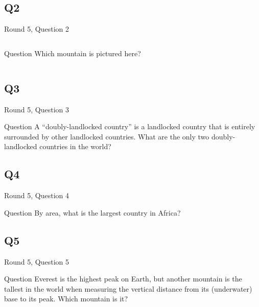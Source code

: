 \documentclass[11pt]{beamer}
\begin{document}
\subsection*{Q2}
\begin{frame}[t]{Round 5, Question 2}
\begin{columns}[T,totalwidth=\linewidth]
\begin{column}{0.32\linewidth}
\begin{block}{Question}
Which mountain is pictured here?
\end{block}
\end{column}
\begin{column}{0.65\linewidth}
\begin{center}
\texttt{[image: \{Images/materhorn]}.jpg}
\end{center}
\end{column}
\end{columns}
\end{frame}
\subsection*{Q3}
\begin{frame}[t]{Round 5, Question 3}
\begin{block}{Question}
A ``doubly-landlocked country'' is a landlocked country that is entirely surrounded by other landlocked countries. What are the only two doubly-landlocked countries in the world?
\end{block}
\end{frame}
\subsection*{Q4}
\begin{frame}[t]{Round 5, Question 4}
\begin{block}{Question}
By area, what is the largest country in Africa?
\end{block}
\end{frame}
\subsection*{Q5}
\begin{frame}[t]{Round 5, Question 5}
\begin{block}{Question}
Everest is the highest peak on Earth, but another mountain is the tallest in the world when measuring the vertical distance from its (underwater) base to its peak. Which mountain is it?
\end{block}
\end{frame}
\end{document}
